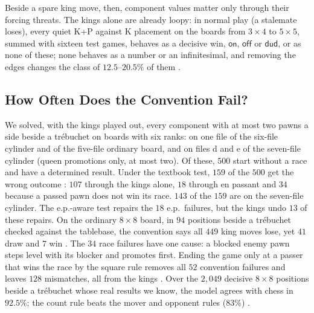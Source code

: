 Beside a spare king move, then, component values matter only through their forcing threats. The kings
alone are already loopy: in normal play (a stalemate loses), every quiet K+P against K placement on the boards
from $3\times4$ to $5\times5$, summed with sixteen test games, behaves as a decisive win, $\textsf{on}$,
$\textsf{off}$ or $\textsf{dud}$, or as none of these; none behaves as a number or an infinitesimal, and removing
the edges changes the class of $12.5$--$20.5\%$ of them .

\subsection{How Often Does the Convention Fail?}\label{sec:kings-sweep}

We solved, with the kings played out, every component with at most two pawns a side beside a
tr\'ebuchet on boards with six ranks: on one file of the six-file cylinder and of the five-file ordinary board,
and on files d and e of the seven-file cylinder (queen promotions only, at most two). Of these, $500$ start without a race and have a determined result. Under the textbook test, $159$ of the $500$ get the wrong outcome : $107$ through
the kings alone, $18$ through en passant and $34$ because a passed pawn does not win its race. $143$ of the
$159$ are on the seven-file cylinder. The e.p.-aware test repairs the $18$ e.p.\ failures, but the kings undo $13$ of these repairs. On the ordinary $8\times8$ board, in $94$ positions beside a tr\'ebuchet checked against the tablebase, the
convention says all $449$ king moves lose, yet $41$ draw and $7$ win . The $34$ race failures have one cause: a blocked
enemy pawn steps level with its blocker and promotes first. Ending the game only at a passer that wins the
race by the square rule removes all $52$ convention failures and leaves $128$ mismatches, all from the
kings . Over the $2{,}049$ decisive $8\times8$ positions beside a tr\'ebuchet whose real results we know,
the model agrees with chess in $92.5\%$; the count rule beats the mover and opponent rules ($83\%$)
.
